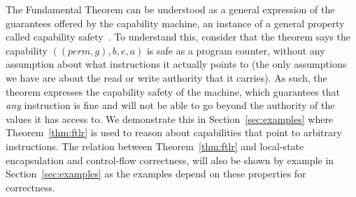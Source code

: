 \documentclass[format=acmsmall, review=true, screen=true]{acmart}
\renewcommand{\sectionname}{Section}
\newcommand{\var}[1]{\mathit{#1}}
\newcommand{\gl}{\var{g}}
\newcommand{\addr}{\var{a}}
\newcommand{\start}{\var{b}}
\newcommand{\addrend}{\var{e}}
\newcommand{\perm}{\var{perm}}
\newcommand{\itoplassug}[1]{}
\begin{document}
The Fundamental Theorem can be understood as a general expression of the
guarantees offered by the capability machine, an instance of a general property
called capability safety~\citep{Devriese:2016ObjCap,Maffeis2010OC}. To
understand this, consider that the theorem says the capability
$((\perm,\gl),\start,\addrend,\addr)$ is safe as a program counter, without any
assumption about what instructions it actually points to (the only assumptions
we have are about the read or write authority that it carries). As such, the
theorem expresses the capability safety of the machine, which guarantees that
\emph{any} instruction is fine and will not be able to go beyond the authority
of the values it has access to. We demonstrate this in
\sectionname~\ref{sec:examples} where Theorem~\ref{thm:ftlr} is used to reason about
capabilities that point to arbitrary instructions. The relation between
Theorem~\ref{thm:ftlr} and local-state encapsulation and control-flow
correctness, will also be shown by example in \sectionname~\ref{sec:examples} as the
examples depend on these properties for correctness.



\itoplassug{Suggestion: Add a small section about reasoning about programs. Add the ``scall works'' and ``malloc works'' lemmas and describe how they are used. This section could also point out the things one have to argue about that are hidden in similar high-level proofs (e.g., the return pointer valid when we return corresponding to restoring memory invariants of caller.).}
\end{document}
